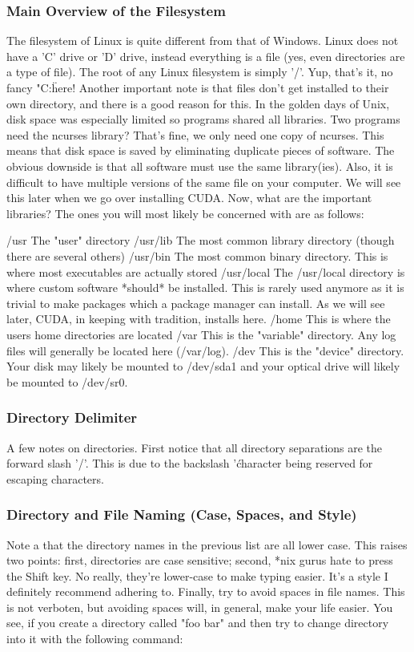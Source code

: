 \subsubsection{Main Overview of the Filesystem} \mdseries 
The filesystem of Linux is quite different from that of Windows.  Linux does not have a 'C' drive or 'D' drive, instead everything is a file (yes, even directories are a type of file).  The root of any Linux filesystem is simply '/'.  Yup, that's it, no fancy "C:\" here!  Another important note is that files don't get installed to their own directory, and there is a good reason for this.  In the golden days of Unix, disk space was especially limited so programs shared all libraries.  Two programs need the ncurses library? That's fine, we only need one copy of ncurses.  This means that disk space is saved by eliminating duplicate pieces of software.  The obvious downside is that all software must use the same library(ies).  Also, it is difficult to have multiple versions of the same file on your computer.  We will see this later when we go over installing CUDA.  Now, what are the important libraries?  The ones you will most likely be concerned with are as follows:

	/usr		The "user" directory
	/usr/lib	The most common library directory (though there are several others)
	/usr/bin	The most common binary directory.  This is where most executables are actually stored
	/usr/local	The /usr/local directory is where custom software *should* be installed.  
				This is rarely used anymore as it is trivial to make packages which a package manager can install.  
				As we will see later, CUDA, in keeping with tradition, installs here.
	/home		This is where the users home directories are located
	/var		This is the "variable" directory.  Any log files will generally be located here (/var/log).
	/dev		This is the "device" directory.  Your disk may likely be mounted to /dev/sda1 and your optical drive will likely be mounted to /dev/sr0.

\subsubsection{Directory Delimiter} \mdseries
A few notes on directories.  First notice that all directory separations are the forward slash '/'.  This is due to the backslash '\' character being reserved for escaping characters.  

\subsubsection{Directory and File Naming (Case, Spaces, and Style)} \mdseries
Note a that the directory names in the previous list are all lower case.  This raises two points: first, directories are case sensitive; second, *nix gurus hate to press the Shift key.  No really, they're lower-case to make typing easier.  It's a style I definitely recommend adhering to.  Finally, try to avoid spaces in file names.  This is not verboten, but avoiding spaces will, in general, make your life easier.  You see, if you create a directory called "foo bar" and then try to change directory into it with the following command:

